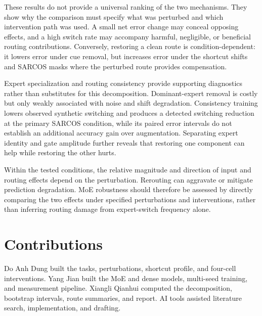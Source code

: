\documentclass[10pt,letterpaper]{article}
\begin{document}
These results do not provide a universal ranking of the two mechanisms. They show why the comparison must specify what was perturbed and which intervention path was used. A small net error change may conceal opposing effects, and a high switch rate may accompany harmful, negligible, or beneficial routing contributions. Conversely, restoring a clean route is condition-dependent: it lowers error under cue removal, but increases error under the shortcut shifts and SARCOS masks where the perturbed route provides compensation.


Expert specialization and routing consistency provide supporting diagnostics rather than substitutes for this decomposition. Dominant-expert removal is costly but only weakly associated with noise and shift degradation. Consistency training lowers observed synthetic switching and produces a detected switching reduction at the primary SARCOS condition, while its paired error intervals do not establish an additional accuracy gain over augmentation. Separating expert identity and gate amplitude further reveals that restoring one component can help while restoring the other hurts.


Within the tested conditions, the relative magnitude and direction of input and routing effects depend on the perturbation. Rerouting can aggravate or mitigate prediction degradation. MoE robustness should therefore be assessed by directly comparing the two effects under specified perturbations and interventions, rather than inferring routing damage from expert-switch frequency alone.


\FloatBarrier

\section*{Contributions}

Do Anh Dung built the tasks, perturbations, shortcut profile, and four-cell interventions. Yang Jian built the MoE and dense models, multi-seed training, and measurement pipeline. Xiangli Qianhui computed the decomposition, bootstrap intervals, route summaries, and report. AI tools assisted literature search, implementation, and drafting.


\FloatBarrier

\nocite{*}




\end{document}

